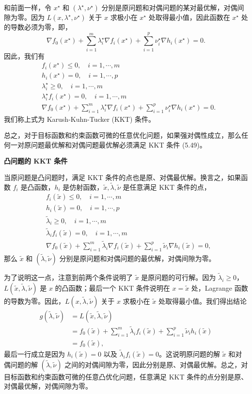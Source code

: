 \documentclass[UTF8,12pt,a4paper,fontset=fandol]{ctexart}
\begin{document}
和前面一样，令 $x^\star$ 和 $(\lambda^\star,\nu^\star)$ 分别是原问题和对偶问题的某对最优解，对偶间隙为零。因为 $L(x,\lambda^\star,\nu^\star)$ 关于 $x$ 求极小在 $x^\star$ 处取得最小值，因此函数在 $x^\star$ 处的导数必须为零，即，
\[
\nabla f_0(x^\star)+\sum_{i=1}^m\lambda_i^\star\nabla f_i(x^\star)+\sum_{i=1}^p\nu_i^\star\nabla h_i(x^\star)=0.
\]
因此，我们有
\begin{equation}
\begin{aligned}
& f_i(x^\star)\leq 0,\quad i=1,\cdots,m\\
& h_i(x^\star)=0,\quad i=1,\cdots,p\\
& \lambda_i^\star\geq 0,\quad i=1,\cdots,m\\
& \lambda_i^\star f_i(x^\star)=0,\quad i=1,\cdots,m\\
& \nabla f_0(x^\star)+\sum_{i=1}^m\lambda_i^\star\nabla f_i(x^\star)+\sum_{i=1}^p\nu_i^\star\nabla h_i(x^\star)=0.
\end{aligned}
\tag{5.49}
\end{equation}
我们称上式为 Karush-Kuhn-Tucker (KKT) 条件。

总之，对于目标函数和约束函数可微的任意优化问题，如果强对偶性成立，那么任何一对原问题最优解和对偶问题最优解必须满足 KKT 条件 (5.49)。

\noindent\textbf{凸问题的 KKT 条件}

当原问题是凸问题时，满足 KKT 条件的点也是原、对偶最优解。换言之，如果函数 $f_i$ 是凸函数，$h_i$ 是仿射函数，$\tilde{x},\tilde{\lambda},\tilde{\nu}$ 是任意满足 KKT 条件的点，
\[
\begin{aligned}
& f_i(\tilde{x})\leq 0,\quad i=1,\cdots,m\\
& h_i(\tilde{x})=0,\quad i=1,\cdots,p\\
& \tilde{\lambda}_i\geq 0,\quad i=1,\cdots,m\\
& \tilde{\lambda}_i f_i(\tilde{x})=0,\quad i=1,\cdots,m\\
& \nabla f_0(\tilde{x})+\sum_{i=1}^m\tilde{\lambda}_i\nabla f_i(\tilde{x})+\sum_{i=1}^p\tilde{\nu}_i\nabla h_i(\tilde{x})=0,
\end{aligned}
\]
那么 $\tilde{x}$ 和 $(\tilde{\lambda},\tilde{\nu})$ 分别是原问题和对偶问题的最优解，对偶间隙为零。

为了说明这一点，注意到前两个条件说明了 $\tilde{x}$ 是原问题的可行解。因为 $\tilde{\lambda}_i\geq 0$，$L(\tilde{x},\tilde{\lambda},\tilde{\nu})$ 是 $x$ 的凸函数；最后一个 KKT 条件说明在 $x=\tilde{x}$ 处，Lagrange 函数的导数为零。因此，$L(x,\tilde{\lambda},\tilde{\nu})$ 关于 $x$ 求极小在 $\tilde{x}$ 处取得最小值。我们得出结论
\[
\begin{aligned}
g(\tilde{\lambda},\tilde{\nu})
&=L(\tilde{x},\tilde{\lambda},\tilde{\nu})\\
&=f_0(\tilde{x})+\sum_{i=1}^m\tilde{\lambda}_i f_i(\tilde{x})+\sum_{i=1}^p\tilde{\nu}_i h_i(\tilde{x})\\
&=f_0(\tilde{x}),
\end{aligned}
\]
最后一行成立是因为 $h_i(\tilde{x})=0$ 以及 $\tilde{\lambda}_i f_i(\tilde{x})=0$。这说明原问题的解 $\tilde{x}$ 和对偶问题的解 $(\tilde{\lambda},\tilde{\nu})$ 之间的对偶间隙为零，因此分别是原、对偶最优解。总之，对目标函数和约束函数可微的任意凸优化问题，任意满足 KKT 条件的点分别是原、对偶最优解，对偶间隙为零。
\end{document}
